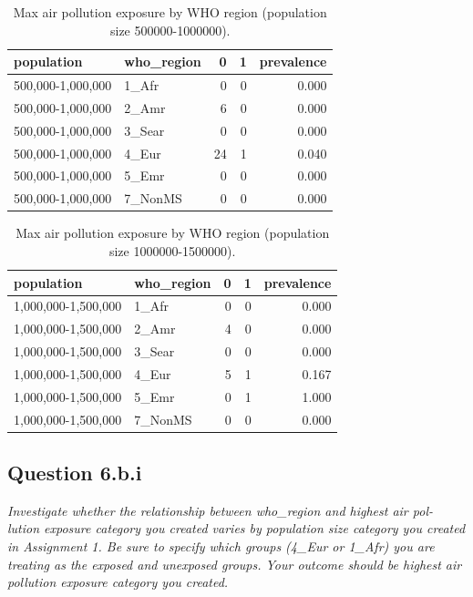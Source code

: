 \begin{table}[H]
    \centering
    \begin{tabular}{llrrr}
        \toprule
        population & who\_region & 0 & 1 & prevalence \\
        \midrule
        500,000-1,000,000 & 1\_Afr & 0 & 0 & 0.000 \\
        500,000-1,000,000 & 2\_Amr & 6 & 0 & 0.000 \\
        500,000-1,000,000 & 3\_Sear & 0 & 0 & 0.000 \\
        500,000-1,000,000 & 4\_Eur & 24 & 1 & 0.040 \\
        500,000-1,000,000 & 5\_Emr & 0 & 0 & 0.000 \\
        500,000-1,000,000 & 7\_NonMS & 0 & 0 & 0.000 \\
        \bottomrule
    \end{tabular}
\caption{Max air pollution exposure by WHO region (population size 500000-1000000).}
\label{tab:pop1000000}
\end{table}

\begin{table}[H]
    \centering
    \begin{tabular}{llrrr}
        \toprule
        population & who\_region & 0 & 1 & prevalence \\
        \midrule
        1,000,000-1,500,000 & 1\_Afr & 0 & 0 & 0.000 \\
        1,000,000-1,500,000 & 2\_Amr & 4 & 0 & 0.000 \\
        1,000,000-1,500,000 & 3\_Sear & 0 & 0 & 0.000 \\
        1,000,000-1,500,000 & 4\_Eur & 5 & 1 & 0.167 \\
        1,000,000-1,500,000 & 5\_Emr & 0 & 1 & 1.000 \\
        1,000,000-1,500,000 & 7\_NonMS & 0 & 0 & 0.000 \\
        \bottomrule
    \end{tabular}
\caption{Max air pollution exposure by WHO region (population size 1000000-1500000).}
\label{tab:pop1500000}
\end{table}

\subsection{Question 6.b.i}
\textit{Investigate whether the relationship between who\_region and highest air pol-
lution exposure category you created varies by population size category you
created in Assignment 1. Be sure to specify which groups (4\_Eur or 1\_Afr)
you are treating as the exposed and unexposed groups. Your outcome should
be highest air pollution exposure category you created.}


